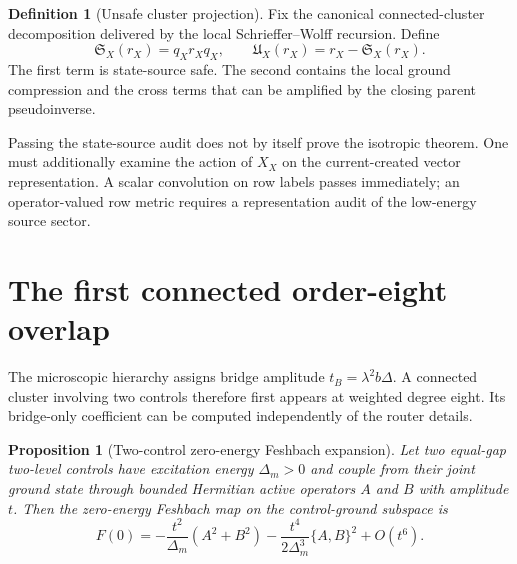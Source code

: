 \documentclass[11pt]{article}
\newtheorem{proposition}[theorem]{Proposition}
\theoremstyle{definition}
\newtheorem{definition}[theorem]{Definition}
\theoremstyle{remark}
\begin{document}
\begin{definition}[Unsafe cluster projection]
Fix the canonical connected-cluster decomposition delivered by the local
Schrieffer--Wolff recursion.  Define
\begin{equation}
 \mathfrak S_X(r_X)=q_Xr_Xq_X,
 \qquad
 \mathfrak U_X(r_X)=r_X-\mathfrak S_X(r_X).
 \label{eq:safe-unsafe}
\end{equation}
The first term is state-source safe.  The second contains the local ground
compression and the cross terms that can be amplified by the closing parent
pseudoinverse.
\end{definition}

Passing the state-source audit does not by itself prove the isotropic theorem.
One must additionally examine the action of $X_X$ on the current-created
vector representation.  A scalar convolution on row labels passes
immediately; an operator-valued row metric requires a representation audit of
the low-energy source sector.

\section{The first connected order-eight overlap}
\label{sec:overlap}

The microscopic hierarchy assigns bridge amplitude $t_B=\lambda^2b\Delta$.
A connected cluster involving two controls therefore first appears at weighted
degree eight.  Its bridge-only coefficient can be computed independently of
the router details.

\begin{proposition}[Two-control zero-energy Feshbach expansion]
\label{prop:two-control}
Let two equal-gap two-level controls have excitation energy $\Delta_m>0$ and
couple from their joint ground state through bounded Hermitian active operators
$A$ and $B$ with amplitude $t$.  Then the zero-energy Feshbach map on the
control-ground subspace is
\begin{equation}
 F(0)
 =-\frac{t^2}{\Delta_m}(A^2+B^2)
 -\frac{t^4}{2\Delta_m^3}\{A,B\}^2
 +O(t^6).
 \label{eq:two-control-expansion}
\end{equation}
\end{proposition}
\end{document}
